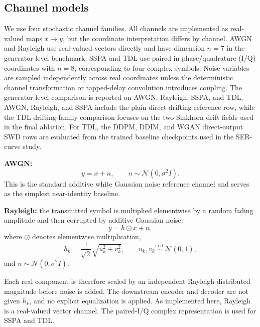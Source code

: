 \documentclass[10pt,journal]{IEEEtran}
\begin{document}
\subsection{Channel models}
We use four stochastic channel families.
All channels are implemented as real-valued maps \(x\mapsto y\), but the coordinate interpretation differs by channel.
AWGN and Rayleigh use real-valued vectors directly and have dimension \(n=7\) in the generator-level benchmark.
SSPA and TDL use paired in-phase/quadrature (I/Q) coordinates with \(n=8\), corresponding to four complex symbols.
Noise variables are sampled independently across real coordinates unless the deterministic channel transformation or tapped-delay convolution introduces coupling.
The generator-level comparison is reported on AWGN, Rayleigh, SSPA, and TDL.
AWGN, Rayleigh, and SSPA include the plain direct-drifting reference row, while the TDL drifting-family comparison focuses on the two Sinkhorn drift fields used in the final ablation.
For TDL, the DDPM, DDIM, and WGAN direct-output SWD rows are evaluated from the trained baseline checkpoints used in the SER-curve study.

\textbf{AWGN:}
\begin{equation}
y = x + n,
\qquad
n \sim \mathcal{N}(0,\sigma^2 I).
\end{equation}
This is the standard additive white Gaussian noise reference channel and serves as the simplest near-identity baseline.

\textbf{Rayleigh:}
the transmitted symbol is multiplied elementwise by a random fading amplitude and then corrupted by additive Gaussian noise:
\begin{equation}
y = h \odot x + n,
\end{equation}
where \(\odot\) denotes elementwise multiplication,
\begin{equation}
h_k = \frac{1}{\sqrt{2}}\sqrt{u_k^2 + v_k^2},
\qquad
u_k,v_k \overset{\text{i.i.d.}}{\sim} \mathcal{N}(0,1),
\end{equation}
and \(n \sim \mathcal{N}(0,\sigma^2 I)\).

Each real component is therefore scaled by an independent Rayleigh-distributed magnitude before noise is added.
The downstream encoder and decoder are not given \(h_k\), and no explicit equalization is applied.
As implemented here, Rayleigh is a real-valued vector channel.
The paired-I/Q complex representation is used for SSPA and TDL.
\end{document}
